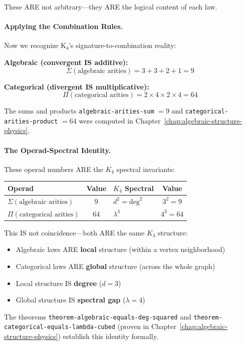 \documentclass[11pt,a4paper]{book}
\begin{document}
These ARE not arbitrary—they ARE the logical content of each law.

\paragraph{Applying the Combination Rules.}

Now we recognize K₄'s signature-to-combination reality:

\textbf{Algebraic (convergent IS additive):}
$$\Sigma(\text{algebraic arities}) = 3 + 3 + 2 + 1 = 9$$

\textbf{Categorical (divergent IS multiplicative):}
$$\Pi(\text{categorical arities}) = 2 \times 4 \times 2 \times 4 = 64$$

The sums and products \verb|algebraic-arities-sum| $= 9$ and 
\verb|categorical-arities-product| $= 64$ were computed in 
Chapter~\ref{chap:algebraic-structure-physics}.

\paragraph{The Operad-Spectral Identity.}

These operad numbers ARE the $K_4$ spectral invariants:

\begin{center}
\begin{tabular}{lclc}
\textbf{Operad} & \textbf{Value} & \textbf{$K_4$ Spectral} & \textbf{Value} \\
\hline
$\Sigma(\text{algebraic arities})$ & 9 & $d^2 = \text{deg}^2$ & $3^2 = 9$ \\
$\Pi(\text{categorical arities})$ & 64 & $\lambda^3$ & $4^3 = 64$ \\
\end{tabular}
\end{center}

This IS not coincidence—both ARE the same $K_4$ structure:
\begin{itemize}
\item Algebraic laws ARE \textbf{local} structure (within a vertex neighborhood)
\item Categorical laws ARE \textbf{global} structure (across the whole graph)
\item Local structure IS \textbf{degree} ($d = 3$)
\item Global structure IS \textbf{spectral gap} ($\lambda = 4$)
\end{itemize}

The theorems \verb|theorem-algebraic-equals-deg-squared| and 
\verb|theorem-categorical-equals-lambda-cubed| (proven in 
Chapter~\ref{chap:algebraic-structure-physics}) establish this identity formally.
\end{document}
